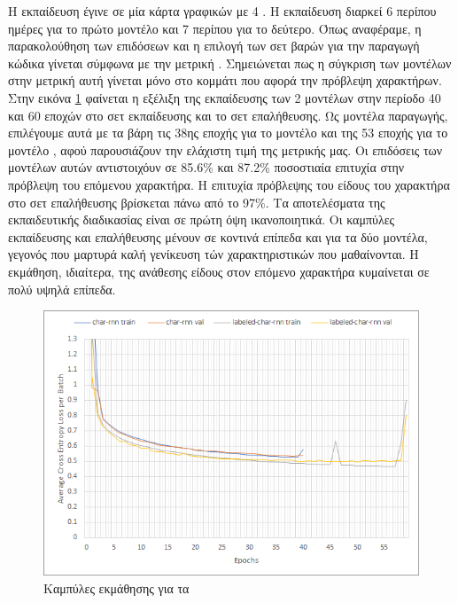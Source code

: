 Η εκπαίδευση έγινε σε μία κάρτα γραφικών  με 4 .
Η εκπαίδευση διαρκεί 6 περίπου ημέρες για το πρώτο μοντέλο και 7 περίπου για το δεύτερο.
Όπως αναφέραμε, η παρακολούθηση των επιδόσεων και η επιλογή των σετ βαρών για την παραγωγή κώδικα γίνεται σύμφωνα με την μετρική .
Σημειώνεται πως η σύγκριση των μοντέλων στην μετρική αυτή γίνεται μόνο στο κομμάτι που αφορά την πρόβλεψη χαρακτήρων.
Στην εικόνα \ref{training1} φαίνεται η εξέλιξη της εκπαίδευσης των 2 μοντέλων στην περίοδο 40 και 60 εποχών στο σετ εκπαίδευσης και το σετ επαλήθευσης. 
Ως μοντέλα παραγωγής, επιλέγουμε αυτά με τα βάρη τις 38ης εποχής για το μοντέλο  και της 53 εποχής για το μοντέλο , αφού παρουσιάζουν την ελάχιστη τιμή της μετρικής μας.
Οι επιδόσεις των μοντέλων αυτών αντιστοιχόυν σε 85.6\% και 87.2\% ποσοστιαία επιτυχία στην πρόβλεψη του επόμενου χαρακτήρα.
Η επιτυχία πρόβλεψης του είδους του χαρακτήρα στο σετ επαλήθευσης βρίσκεται πάνω από το 97\%.
Τα αποτελέσματα της εκπαιδευτικής διαδικασίας είναι σε πρώτη όψη ικανοποιητικά. Οι καμπύλες εκπαίδευσης και επαλήθευσης μένουν σε κοντινά επίπεδα και για τα δύο μοντέλα, γεγονός που μαρτυρά καλή γενίκευση τών χαρακτηριστικών που μαθαίνονται. Η εκμάθηση, ιδιαίτερα, της ανάθεσης είδους στον επόμενο χαρακτήρα κυμαίνεται σε πολύ υψηλά επίπεδα. 

\begin{figure}[h]
	\includegraphics[trim = 2 2 2 2, clip, keepaspectratio]{images/training1.png}
	\centering
	\caption{Καμπύλες εκμάθησης για τα }
	\label{training1}
\end{figure}

